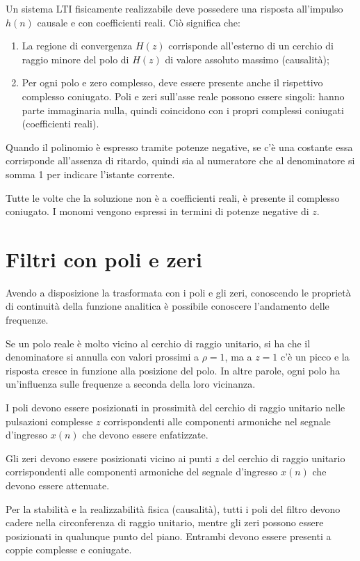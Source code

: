 Un sistema LTI fisicamente realizzabile deve possedere una risposta all'impulso $h(n)$ causale e con coefficienti reali. Ciò significa che:
\begin{enumerate}
	\item La regione di convergenza $H(z)$ corrisponde all'esterno di un cerchio di raggio minore del polo di $H(z)$ di valore assoluto massimo (causalità);
	\item Per ogni polo e zero complesso, deve essere presente anche il rispettivo complesso coniugato. Poli e zeri sull'asse reale possono essere singoli: hanno parte immaginaria nulla, quindi coincidono con i propri complessi coniugati (coefficienti reali).
\end{enumerate}

Quando il polinomio è espresso tramite potenze negative, se c'è una costante essa corrisponde all'assenza di ritardo, quindi sia al numeratore che al denominatore si somma 1 per indicare l'istante corrente. 

Tutte le volte che la soluzione non è a coefficienti reali, è presente il complesso coniugato. I monomi vengono espressi in termini di potenze negative di $z$.

\section{Filtri con poli e zeri}
Avendo a disposizione la trasformata con i poli e gli zeri, conoscendo le proprietà di continuità della funzione analitica è possibile conoscere l'andamento delle frequenze.

Se un polo reale è molto vicino al cerchio di raggio unitario, si ha che il denominatore si annulla con valori prossimi a $\rho = 1$, ma a $z = 1$ c'è un picco e la risposta cresce in funzione alla posizione del polo. In altre parole, ogni polo ha un'influenza sulle frequenze a seconda della loro vicinanza.

I poli devono essere posizionati in prossimità del cerchio di raggio unitario nelle pulsazioni complesse $z$ corrispondenti alle componenti armoniche nel segnale d'ingresso $x(n)$ che devono essere enfatizzate.

Gli zeri devono essere posizionati vicino ai punti $z$ del cerchio di raggio unitario corrispondenti alle componenti armoniche del segnale d'ingresso $x(n)$ che devono essere attenuate.

Per la stabilità e la realizzabilità fisica (causalità), tutti i poli del filtro devono cadere nella circonferenza di raggio unitario, mentre gli zeri possono essere posizionati in qualunque punto del piano. Entrambi devono essere presenti a coppie complesse e coniugate.


